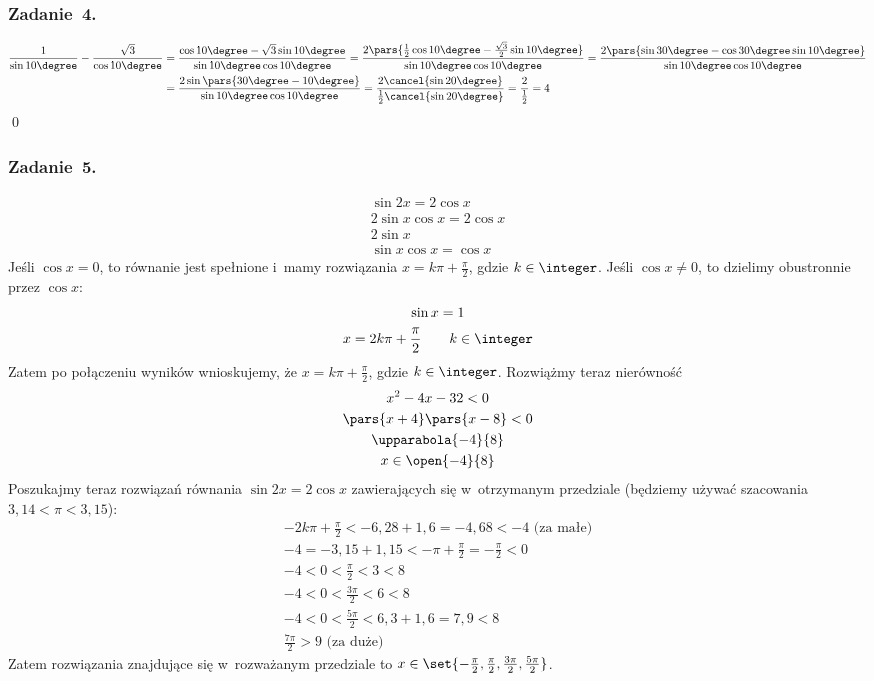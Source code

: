 \subsubsection*{Zadanie~4.}
\begin{gather*}
    \begin{split}
        \frac{1}{\sin10\degree} - \frac{\sqrt{3}}{\cos10\degree}
            &= \frac{\cos10\degree - \sqrt{3}\sin10\degree}{\sin10\degree\cos10\degree}
            = \frac{2\pars{\frac{1}{2}\cos10\degree - \frac{\sqrt{3}}{2}\sin10\degree}}{\sin10\degree\cos10\degree}
            = \frac{2\pars{\sin30\degree - \cos30\degree\sin10\degree}}{\sin10\degree\cos10\degree}\\
            &= \frac{2\sin\pars{30\degree - 10\degree}}{\sin10\degree\cos10\degree}
            = \frac{2\cancel{\sin20\degree}}{\frac{1}{2}\cancel{\sin20\degree}}
            = \frac{2}{\frac{1}{2}}
            = 4
    \end{split}
\end{gather*}
\qed
\subsubsection*{Zadanie~5.}
\begin{gather*}
    \sin2x = 2\cos x\\
    2\sin x\cos x = 2\cos x\\
    2\sin x\\
    \sin x\cos x = \cos x
\end{gather*}
Jeśli \(\cos x = 0\), to równanie jest spełnione i~mamy rozwiązania \(x = k\pi + \frac{\pi}{2}\), gdzie \(k \in \integer\). Jeśli \(\cos x \neq 0\), to dzielimy obustronnie przez \(\cos x\):
\begin{gather*}
    \sin x = 1\\
    x = 2k\pi + \frac{\pi}{2} \qquad k \in \integer
\end{gather*}
Zatem po połączeniu wyników wnioskujemy, że \(x = k\pi + \frac{\pi}{2}\), gdzie \(k \in \integer\). Rozwiążmy teraz nierówność
\begin{gather*}
    x^2 - 4x - 32 < 0\\
    \pars{x + 4}\pars{x - 8} < 0\\
    \upparabola{-4}{8}\\
    x \in \open{-4}{8}
\end{gather*}
Poszukajmy teraz rozwiązań równania \(\sin2x = 2\cos x\) zawierających się w~otrzymanym przedziale (będziemy używać szacowania \(3{,}14 < \pi < 3{,}15\)):
\begin{gather*}
    -2k\pi + \frac{\pi}{2} < -6{,}28 + 1{,}6 = -4{,}68 < -4 \text{ (za małe)}\\
    -4 = -3{,}15 + 1{,15} < -\pi + \frac{\pi}{2} = -\frac{\pi}{2} < 0\\
    -4 < 0 < \frac{\pi}{2} < 3 < 8\\
    -4 < 0 < \frac{3\pi}{2} < 6 < 8\\
    -4 < 0 < \frac{5\pi}{2} < 6{,}3 + 1{,}6 = 7{,}9 < 8\\
    \frac{7\pi}{2} > 9 \text{ (za duże)}
\end{gather*}
Zatem rozwiązania znajdujące się w~rozważanym przedziale to \(x \in \set{-\frac{\pi}{2}, \frac{\pi}{2}, \frac{3\pi}{2}, \frac{5\pi}{2}}\).
